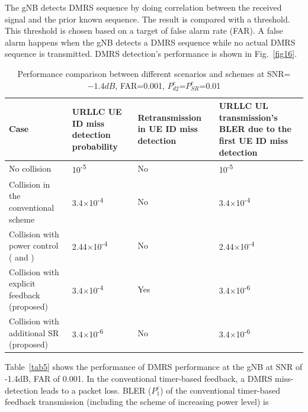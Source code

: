 \documentclass{ieeeaccess}
\begin{document}
The gNB detects DMRS sequence by doing correlation between the received signal and the prior known sequence. The result is compared with a threshold. This threshold is chosen based on a target of false alarm rate (FAR). A false alarm happens when the gNB detects a DMRS sequence while no actual DMRS sequence is transmitted. DMRS detection's performance is shown in Fig.~\ref{fig16}.

\begin{table}[htbp]
\caption{Performance comparison between different scenarios and schemes at SNR=$-1.4dB$, FAR=0.001, $P^{e}_{d2}$=$P^{e}_{SR}$=0.01}
\begin{center}
\begin{tabular}{|p{19em}|p{9em}|p{10em}|p{12em}|}
 \hline
 \textbf{Case} & \textbf{URLLC UE ID miss detection probability}& \textbf{Retransmission in UE ID miss detection}& \textbf{URLLC UL transmission's BLER due to the first UE ID miss detection}\\
 \hline
 No collision  & 10\textsuperscript{-5}&No&10\textsuperscript{-5}\\
 \hline
 Collision in the conventional scheme& 3.4$\times$10\textsuperscript{-4}&No&3.4$\times$10\textsuperscript{-4}\\
 \hline
 Collision with power control (\cite{ref13} and \cite {ref14})&2.44$\times$10\textsuperscript{-4}&No&2.44$\times$10\textsuperscript{-4}\\
 \hline
 Collision with explicit feedback (proposed)& 3.4$\times$10\textsuperscript{-4}&Yes&3.4$\times$10\textsuperscript{-6}\\
\hline
 Collision with additional SR (proposed)& 3.4$\times$10\textsuperscript{-6}&No&3.4$\times$10\textsuperscript{-6}\\

 
 \hline
\end{tabular}
\label{tab10}
\end{center}
\vspace{-6mm}
\end{table}

Table~\ref{tab5} shows the performance of DMRS performance at the gNB at SNR of -1.4dB, FAR of 0.001. In the conventional timer-based feedback, a DMRS miss-detection leads to a packet loss. BLER ($ P^{e}_{1}$) of the conventional timer-based feedback transmission (including the scheme of increasing power level) is 
\end{document}
